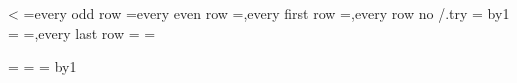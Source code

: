 {	%
	\relax
	\ifnum\c@pgfplotstable@colindex<\c@pgfplotstable@numcols
		\pgfplots@loop@CONTINUEtrue
	\else
		\pgfplots@loop@CONTINUEfalse
	\fi
	\def\pgfplotstablecolname{\pgfplots@error{Sorry, you can't evaluate \string\pgfplotstablecolname\space in this context.}}%
	\pgfutil@loop
	\ifpgfplots@loop@CONTINUE
		\pgfplotsarrayselect\c@pgfplotstable@colindex\of\pgfplotstabletypeset@final@cols@array\to\pgfplotstable@col@processed
		\pgfplotslistcheckempty\pgfplotstable@col@processed
		\ifpgfplotslistempty
			\pgfplots@loop@CONTINUEfalse
		\else
			\ifnum{}\relax
				\begingroup
				\ifodd\c@pgfplotstable@rowindex
					\t@pgfplots@toka={every odd row}%
				\else
					\t@pgfplots@toka={every even row}%
				\fi
				\ifnum{}\relax
					\t@pgfplots@toka=\expandafter{\the\t@pgfplots@toka,every first row}%
				\fi
				\ifpgfplotstable@disable@rowcolstyles
				\else
					\edef\pgfplotstable@loc@TMPa{\the\t@pgfplots@toka,every row no \the\c@pgfplotstable@rowindex/.try}%
					\t@pgfplots@toka=\expandafter{\pgfplotstable@loc@TMPa}%
				\fi
				\c@pgfplotstable@colindex=\c@pgfplotstable@rowindex
				\advance\c@pgfplotstable@colindex by1\relax
				\ifnum\c@pgfplotstable@colindex=\c@pgfplotstable@numrows
					\t@pgfplots@toka=\expandafter{\the\t@pgfplots@toka,every last row}%
				\fi
				\expandafter\pgfplotstableset\expandafter{\the\t@pgfplots@toka}%
				\t@pgfplots@toka=\expandafter{\pgfplotstable@before}%
				\t@pgfplots@tokb=\expandafter{\pgfplotstable@after}%
				\xdef\pgfplots@glob@TMPc{%
					\noexpand\def\noexpand\pgfplotstable@before{\the\t@pgfplots@toka}%
					\noexpand\def\noexpand\pgfplotstable@after{\the\t@pgfplots@tokb}%
				}%
				\endgroup
				\pgfplots@glob@TMPc
				\t@pgfplots@toka=\expandafter{\pgfplotstable@before}%
				\t@pgfplots@tokb=\expandafter{\pgfplotstable@curline}%
				\edef\pgfplotstable@curline{\the\t@pgfplots@tokb\the\t@pgfplots@toka}%
			\fi
			\pgfplotslistpopfront\pgfplotstable@col@processed\to\pgfplotstable@entry
			\pgfplotsarrayletentry\c@pgfplotstable@colindex\of\pgfplotstabletypeset@final@cols@array=\pgfplotstable@col@processed
			\advance\c@pgfplotstable@colindex by1\relax
}
